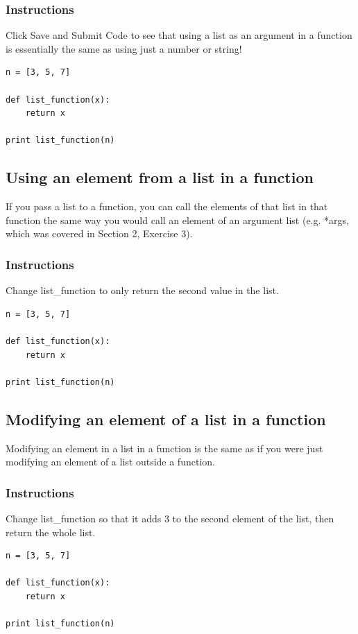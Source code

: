 \documentclass[12pt,a4paper,final,twoside,onecolumn,titlepage]{book}
\begin{document}
\subsubsection{Instructions}

Click Save and Submit Code to see that using a list as an argument in a function is essentially the same as using just a number or string!
\begin{lstlisting}
n = [3, 5, 7]

def list_function(x):
    return x

print list_function(n)
\end{lstlisting}

\subsection{Using an element from a list in a function}

If you pass a list to a function, you can call the elements of that list in that function the same way you would call an element of an argument list (e.g. *args, which was covered in Section 2, Exercise 3).
\subsubsection{Instructions}

Change list\_function to only return the second value in the list.
\begin{lstlisting}
n = [3, 5, 7]

def list_function(x):
    return x

print list_function(n)
\end{lstlisting}
\subsection{Modifying an element of a list in a function}

Modifying an element in a list in a function is the same as if you were just modifying an element of a list outside a function.
\subsubsection{Instructions}

Change list\_function so that it adds 3 to the second element of the list, then return the whole list.
\begin{lstlisting}
n = [3, 5, 7]

def list_function(x):
    return x

print list_function(n)
\end{lstlisting}
\end{document}
